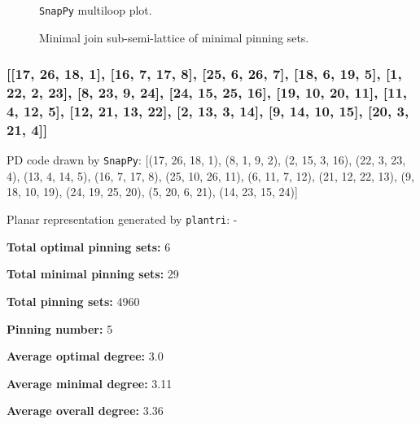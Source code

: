 \documentclass{article}%
\begin{document}
\begin{multicols}{2}
\begin{figure}[H]
\centering

\caption{\texttt{SnapPy} multiloop plot.}
\label{fig:tex/img/[[14, 20, 1, 15], [15, 5, 16, 6], [6, 13, 7, 14], [7, 19, 8, 20], [1, 8, 2, 9], [4, 26, 5, 21], [16, 26, 17, 25], [12, 24, 13, 25], [18, 23, 19, 24], [2, 23, 3, 22], [9, 22, 10, 21], [10, 3, 11, 4], [.svg}
\end{figure}
\columnbreak

\begin{figure}[H]
\centering
\scalebox{0.8}{}
\caption{Minimal join sub-semi-lattice of minimal pinning sets.}
\label{fig:tex/img/[[14, 20, 1, 15], [15, 5, 16, 6], [6, 13, 7, 14], [7, 19, 8, 20], [1, 8, 2, 9], [4, 26, 5, 21], [16, 26, 17, 25], [12, 24, 13, 25], [18, 23, 19, 24], [2, 23, 3, 22], [9, 22, 10, 21], [10, 3, 11, 4], [.pgf}
\end{figure}
\end{multicols}

\newpage

\subsubsection{[[17, 26, 18, 1], [16, 7, 17, 8], [25, 6, 26, 7], [18, 6, 19, 5], [1, 22, 2, 23], [8, 23, 9, 24], [24, 15, 25, 16], [19, 10, 20, 11], [11, 4, 12, 5], [12, 21, 13, 22], [2, 13, 3, 14], [9, 14, 10, 15], [20, 3, 21, 4]]}

{\small\noindent PD code drawn by \texttt{SnapPy}: [(17, 26, 18, 1), (8, 1, 9, 2), (2, 15, 3, 16), (22, 3, 23, 4), (13, 4, 14, 5), (16, 7, 17, 8), (25, 10, 26, 11), (6, 11, 7, 12), (21, 12, 22, 13), (9, 18, 10, 19), (24, 19, 25, 20), (5, 20, 6, 21), (14, 23, 15, 24)]}

{\small\noindent Planar representation generated by \texttt{plantri}: -}

\begin{multicols}{2}
{\normalsize \noindent\textbf{Total optimal pinning sets:} 6

\noindent\textbf{Total minimal pinning sets:} 29

\noindent\textbf{Total pinning sets:} 4960

\noindent\textbf{Pinning number:} 5

}
\columnbreak

{\normalsize \noindent\textbf{Average optimal degree:} 3.0

\noindent\textbf{Average minimal degree:} 3.11

\noindent\textbf{Average overall degree:} 3.36

}
\end{multicols}
\end{document}

